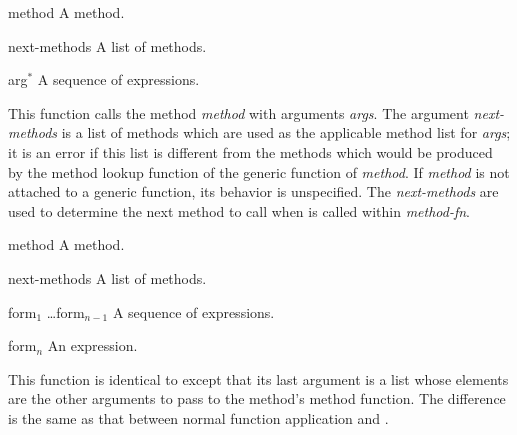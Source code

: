 \begin{optDefinition}
%
\begin{arguments}
    \item[method] A method.
    \item[next-methods] A list of methods.
    \item[arg$^*$] A sequence of expressions.
\end{arguments}
%
This function calls the method {\em method} with arguments {\em args}.
The argument {\em next-methods} is a list of methods which are used as
the applicable method list for {\em args}; it is an error if this list
is different from the methods which would be produced by the method
lookup function of the generic function of {\em method}.  If {\em
method} is not attached to a generic function, its behavior is
unspecified.  The {\em next-methods} are used to determine the next
method to call when  is called within {\em
method-fn}.

%
\begin{arguments}
    \item[method] A method.
    \item[next-methods] A list of methods.
    \item[form$_1$ \ldots form$_{n-1}$] A sequence of expressions.
    \item[form$_n$] An expression.
\end{arguments}
%
This function is identical to  except that its last
argument is a list whose elements are the other arguments to pass to
the method's method function.  The difference is the same as that
between normal function application and .
%
\end{optDefinition}

